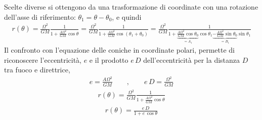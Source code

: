 \documentclass[letterpaper,10pt,italian]{jupyterBook}
\begin{document}
\sphinxAtStartPar
Scelte diverse si ottengono da una trasformazione di coordinate con una rotazione dell’asse di riferimento: \(\theta_1 = \theta - \theta_0\), e quindi
\begin{equation*}
\begin{split}r(\theta) = \frac{\Omega^2}{GM}\frac{1}{1 + \frac{A\Omega^2}{GM} \cos \theta} = \frac{\Omega^2}{GM}\frac{1}{1 + \frac{A\Omega^2}{GM} \cos (\theta_1 + \theta_0 )} = \frac{\Omega^2}{GM}\frac{1}{1 + \underbrace{\frac{A\Omega^2}{GM} \cos \theta_0}_{= A_1} \cos \theta_1 \underbrace{- \frac{A \Omega^2}{GM} \sin \theta_0}_{= B_1} \sin \theta_1 }\end{split}
\end{equation*}
\sphinxAtStartPar
Il confronto con l’equazione delle coniche in coordinate polari, permette di riconoscere l’eccentricità, \(e\) e il prodotto \(e \, D\) dell’eccentricità per la distanza \(D\) tra fuoco e direttrice,
\begin{equation*}
\begin{split}e = \frac{A \Omega^2}{GM} \qquad , \qquad e \, D = \frac{\Omega^2}{GM}\end{split}
\end{equation*}\begin{equation*}
\begin{split}r(\theta) = \frac{\Omega^2}{GM}\frac{1}{1 + \frac{A\Omega^2}{GM} \cos \theta}\end{split}
\end{equation*}\begin{equation*}
\begin{split}r(\theta) = \frac{e \, D}{1 + e \, \cos \theta}\end{split}
\end{equation*}
\end{document}
